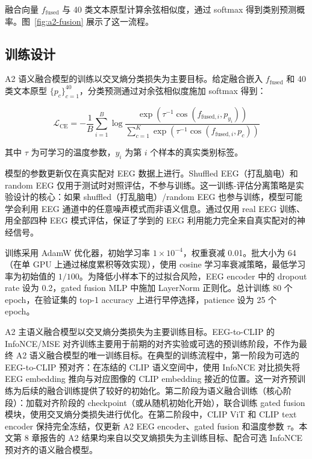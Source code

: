 融合向量 $f_{\mathrm{fused}}$ 与 40 类文本原型计算余弦相似度，通过 softmax 得到类别预测概率。图~\ref{fig:a2-fusion} 展示了这一流程。


\subsection{训练设计}

A2 语义融合模型的训练以交叉熵分类损失为主要目标。给定融合嵌入 $f_{\mathrm{fused}}$ 和 40 类文本原型 $\{p_c\}_{c=1}^{40}$，分类预测通过对余弦相似度施加 softmax 得到：

\begin{equation}
  \mathcal{L}_{\mathrm{CE}} = -\frac{1}{B} \sum_{i=1}^{B} \log \frac{\exp(\tau^{-1} \cos(f_{\mathrm{fused},i}, p_{y_i}))}{\sum_{c=1}^{K} \exp(\tau^{-1} \cos(f_{\mathrm{fused},i}, p_c))}
\end{equation}

其中 $\tau$ 为可学习的温度参数，$y_i$ 为第 $i$ 个样本的真实类别标签。

模型的参数更新仅在真实配对 EEG 数据上进行。Shuffled EEG（打乱脑电）和 random EEG 仅用于测试时对照评估，不参与训练。这一训练-评估分离策略是实验设计的核心：如果 shuffled（打乱脑电）/random EEG 也参与训练，模型可能学会利用 EEG 通道中的任意噪声模式而非语义信息。通过仅用 real EEG 训练、用全部四种 EEG 模式评估，保证了学到的 EEG 利用能力完全来自真实配对的神经信号。

训练采用 AdamW 优化器，初始学习率 $1\times10^{-4}$，权重衰减 0.01。批大小为 64（在单 GPU 上通过梯度累积等效实现），使用 cosine 学习率衰减策略，最低学习率为初始值的 $1/100$。为降低小样本下的过拟合风险，EEG encoder 中的 dropout rate 设为 0.2，gated fusion MLP 中施加 LayerNorm 正则化。总计训练 80 个 epoch，在验证集的 top-1 accuracy 上进行早停选择，patience 设为 25 个 epoch。

A2 主语义融合模型以交叉熵分类损失为主要训练目标。EEG-to-CLIP 的 InfoNCE/MSE 对齐训练主要用于前期的对齐实验或可选的预训练阶段，不作为最终 A2 语义融合模型的唯一训练目标。在典型的训练流程中，第一阶段为可选的 EEG-to-CLIP 预对齐：在冻结的 CLIP 语义空间中，使用 InfoNCE 对比损失将 EEG embedding 推向与对应图像的 CLIP embedding 接近的位置。这一对齐预训练为后续的融合训练提供了较好的初始化。第二阶段为语义融合训练（核心阶段）：加载对齐阶段的 checkpoint（或从随机初始化开始），联合训练 gated fusion 模块，使用交叉熵分类损失进行优化。在第二阶段中，CLIP ViT 和 CLIP text encoder 保持完全冻结，仅更新 A2 EEG encoder、gated fusion 和温度参数 $\tau$。本文第 8 章报告的 A2 结果均来自以交叉熵损失为主训练目标、配合可选 InfoNCE 预对齐的语义融合模型。

